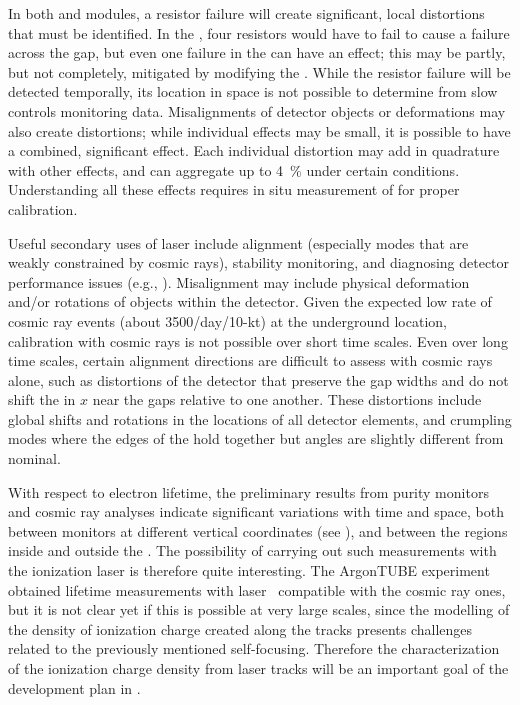 In both \single and \dual modules, %
a resistor failure will create significant, local \efield distortions that must be identified. In the , %
four resistors would have to fail to cause a failure across the  gap, but even one failure in the  can have an effect; this may be partly, but not completely, mitigated by modifying the . While the resistor failure will be detected temporally, its location in space is not possible to determine from slow controls monitoring data. Misalignments of detector objects or deformations may also create \efield distortions; while individual effects may be small, it is possible to have a combined, significant effect.
Each individual \efield distortion may add in quadrature with other effects, and can aggregate up to \SI{4}{\%} under certain conditions. Understanding all these effects requires in situ  measurement of \efield for proper calibration. 

Useful secondary uses of laser include alignment (especially modes that are weakly constrained by cosmic rays),
stability monitoring, and diagnosing detector performance issues
(e.g., ).  
Misalignment may include physical deformation and/or rotations of objects within the detector. Given the expected low rate of cosmic ray events (about 3500/day/10-kt) at the underground location, calibration with cosmic rays is not possible over short time scales. Even over long time scales, certain alignment directions  are difficult to assess with cosmic rays alone, such as distortions of the detector that preserve the gap widths and do not shift the  in $x$ near the gaps relative to one another.
These distortions include global shifts and rotations in the locations of all detector elements, and crumpling modes where the edges of the  hold together but angles are slightly different from nominal.   

With respect to electron lifetime, the preliminary results from  purity monitors and cosmic ray analyses indicate significant variations with time and space, both between monitors at different vertical coordinates (see  \spchcisc), and between the regions inside and outside the . The possibility of carrying out such measurements with the ionization laser is therefore quite interesting. The ArgonTUBE experiment obtained lifetime measurements with laser~\cite{Ereditato:2013xaa} compatible with the cosmic ray ones, but it is not clear yet if this is possible at very large scales, since the modelling of the density of ionization charge created along the tracks presents challenges related to the previously mentioned self-focusing. Therefore the characterization of the ionization charge density from laser tracks will be an important goal of the development plan in .


